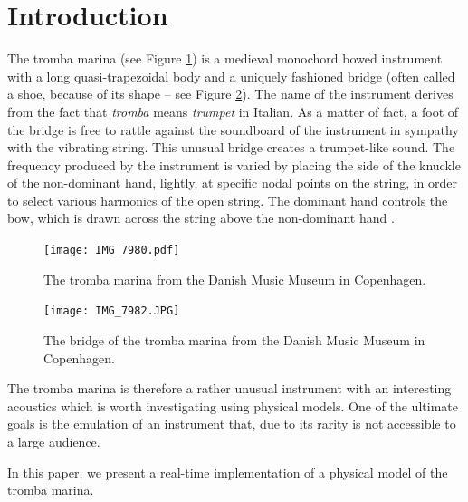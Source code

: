 \documentclass[dvipsnames, pdftex]{article}
\title{\papertitle}
\def\SBcomment[#1]{\textcolor{Red}{#1}}
\def\MDcomment[#1]{\textcolor{Blue}{#1}}
\def\SScomment[#1]{\textcolor{OliveGreen}{#1}}
\begin{document}
%
\capstartfalse
\maketitle
\capstarttrue
%
\begin{abstract}
You can place comments in colour if you want :) Like \SBcomment[this (Stefan)], \MDcomment[this (Michele)] or \SScomment[this (Stefania)].
\end{abstract}
%

\section{Introduction}\label{sec:introduction}
The tromba marina (see Figure 
 \ref{fig:tromba}) is a medieval monochord bowed instrument with a long quasi-trapezoidal body and a uniquely fashioned bridge (often called a shoe, because of its shape – see Figure \ref{fig:bridge}). 
 The name of the instrument derives from the fact that {\em tromba} means {\em trumpet} in Italian. As a matter of fact,
 a foot of the bridge is free to rattle against the soundboard of the instrument in sympathy with the vibrating string. 
 This unusual bridge creates a trumpet-like sound.
 The frequency produced by the instrument is varied by placing the side of the knuckle of the non-dominant hand, lightly, at specific nodal points on the string, in order to select various harmonics of the open string. The dominant hand controls the bow, which is drawn across the string above the non-dominant hand \cite{munrow1976instruments}.
 
 
 
  
   \begin{figure}
  \centering
  \texttt{[image: IMG\_7980.pdf]}
  \caption{The tromba marina from the Danish Music Museum in Copenhagen. }
  \label{fig:tromba}
\end{figure}

   \begin{figure}
  \centering
  \texttt{[image: IMG\_7982.JPG]}
  \caption{The bridge of the tromba marina from the Danish Music Museum in Copenhagen. }
  \label{fig:bridge}
\end{figure}

The tromba marina is therefore a rather unusual instrument with an interesting acoustics which is worth investigating using  physical models. 
One of the ultimate goals is the emulation of an instrument that, due to its rarity is not accessible to a large audience.

In this paper, we present a real-time implementation of a physical model of the tromba marina.
\end{document}
